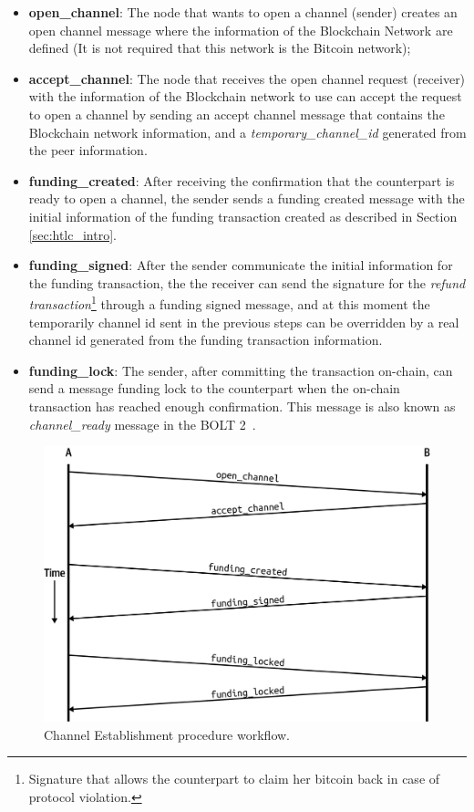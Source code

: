 \begin{itemize}
  \item {\bf open\_channel}: The node that wants to open a channel (sender) creates an open channel message where the information of the
        Blockchain Network are defined (It is not required that this network is the Bitcoin network);
  \item {\bf accept\_channel}: The node that receives the open channel request (receiver) with the information of the Blockchain network to use
        can accept the request to open a channel by sending an accept channel message that contains the Blockchain network information, and
        a \emph{temporary\_channel\_id} generated from the peer information.
  \item {\bf funding\_created}: After receiving the confirmation that the counterpart is ready to open a channel, the sender
        sends a funding created message with the initial information of the funding transaction created as described in Section \ref{sec:htlc_intro}.
  \item {\bf funding\_signed}: After the sender communicate the initial information for the funding transaction, the
        the receiver can send the signature for the \emph{refund transaction}\footnote{Signature that allows the counterpart to claim her bitcoin back in case of protocol violation.} through a funding signed message, and at this moment the temporarily
        channel id sent in the previous steps can be overridden by a real channel id generated from the funding transaction information.
  \item {\bf funding\_lock}: The sender, after committing the transaction on-chain, can send a message funding lock to the counterpart when
        the on-chain transaction has reached enough confirmation. This message is also known as \emph{channel\_ready} message in the BOLT 2~\cite{bolt2}.
\end{itemize}

\begin{figure}[h]
  \begin{center}
  \includegraphics[width=0.6\columnwidth]{imgs/mtln_0703.png}
  \end{center}
    \caption{Channel Establishment procedure workflow.~\cite{lnbook}}
  \label{fig:channel-establishment}
\end{figure}

